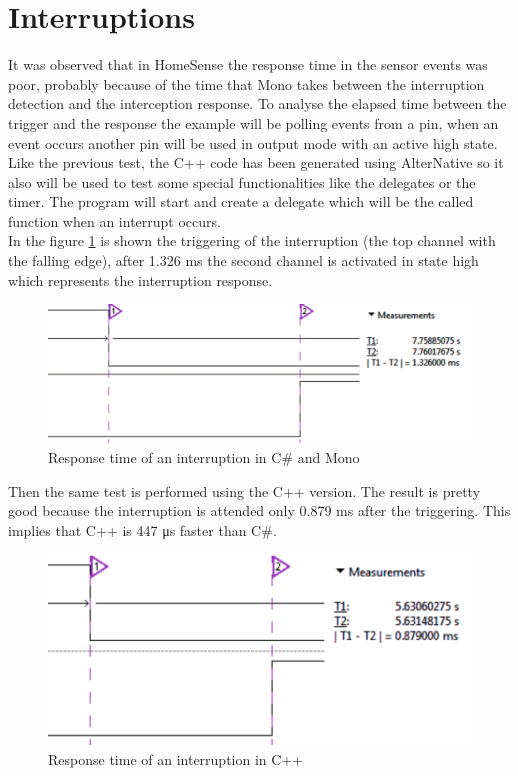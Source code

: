 \section{Interruptions}\label{S:Performance-Interruptions}
It was observed that in HomeSense the response time in the sensor events was poor, probably because of the time that Mono takes between the interruption detection and the interception response. To analyse the elapsed time between the trigger and the response the example will be polling events from a pin, when an event occurs another pin  will be used in output mode with an active high state.
\\
Like the previous test, the C++ code has been generated using AlterNative so it also will be used to test some special functionalities like the delegates or the timer. The program will start and create a delegate which will be the called function when an interrupt occurs.
\\
In the figure \ref{fig:interrupt-csharp} is shown the triggering of the interruption (the top channel with the falling edge), after 1.326 ms the second channel is activated in state high which represents the interruption response.
\begin{figure}[H]\begin{center}
 \centering
  \captionsetup{justification=centering}
  \includegraphics[scale=0.65]{pictures/performance-tests/Interruptions/csharp}
  \caption{Response time of an interruption in C\# and Mono\label{fig:interrupt-csharp}}
\end{center}\end{figure}
Then the same test is performed using the C++ version. The result is pretty good because the interruption is attended only 0.879 ms after the triggering. This implies that C++ is 447 μs faster than C\#.
\begin{figure}[H]\begin{center}
 \centering
  \captionsetup{justification=centering}
  \includegraphics[scale=0.65]{pictures/performance-tests/Interruptions/cxx}
  \caption{Response time of an interruption in C++\label{fig:interrupt-cxx}}
\end{center}\end{figure}
